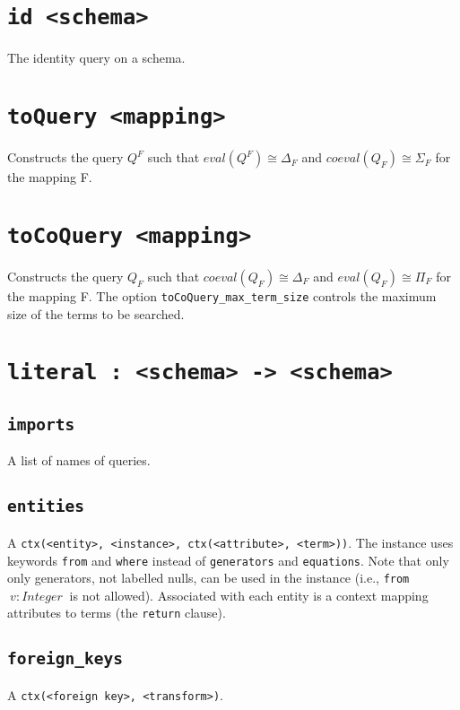 \documentclass[10pt]{book}
\begin{document}
\section{{\tt id <schema>}}
The identity query on a schema.

\section{{\tt toQuery <mapping>}}
Constructs the query $Q^F$ such that $eval(Q^F) \cong \Delta_F$ and $coeval(Q_F) \cong \Sigma_F$ for the mapping F.

\section{{\tt toCoQuery <mapping>}}
Constructs the query $Q_F$ such that $coeval(Q_F) \cong \Delta_F$ and $eval(Q_F) \cong \Pi_F$ for the mapping F.  The option {\tt toCoQuery\_max\_term\_size} controls the maximum size of the terms to be searched.


\section{{\tt literal : <schema> -> <schema>}}
\subsection{{\tt imports}}
A list of names of queries.
\subsection{{\tt entities}}
A {\tt ctx(<entity>, <instance>, ctx(<attribute>, <term>))}.  The instance uses keywords {\tt from} and {\tt where} instead of {\tt generators} and {\tt equations}.  Note that only only generators, not labelled nulls, can be used in the instance (i.e., {\tt from} $\ v:Integer \ $ is not allowed).  Associated with each entity is a context mapping attributes to terms (the {\tt return} clause).

\subsection{{\tt foreign\_keys}}
A {\tt ctx(<foreign key>, <transform>)}.
\end{document}
